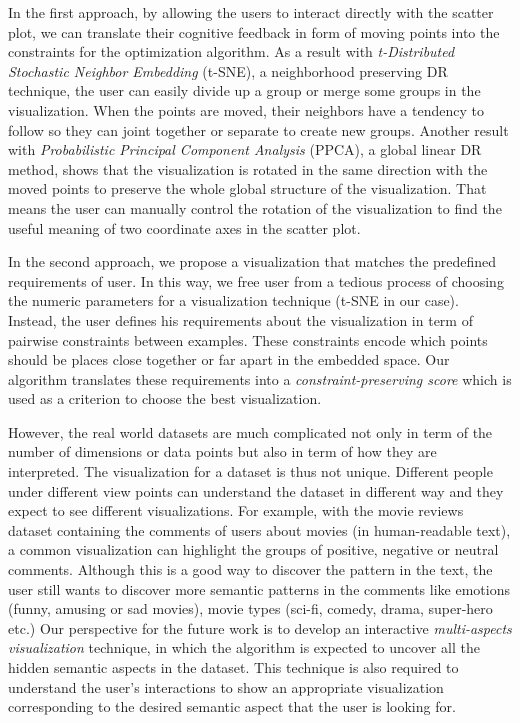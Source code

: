 In the first approach, by allowing the users to interact directly with the scatter plot, we can translate their cognitive feedback in form of moving points into the constraints for the optimization algorithm.
As a result with \emph{t-Distributed Stochastic Neighbor Embedding} (t-SNE), a neighborhood preserving DR technique, the user can easily divide up a group or merge some groups in the visualization.
When the points are moved, their neighbors have a tendency to follow so they can joint together or separate to create new groups.
Another result with \emph{Probabilistic Principal Component Analysis} (PPCA), a global linear DR method, shows that the visualization is rotated in the same direction with the moved points to preserve the whole global structure of the visualization. That means the user can manually control the rotation of the visualization to find the useful meaning of two coordinate axes in the scatter plot.

In the second approach, we propose a visualization that matches the predefined requirements of user.
In this way, we free user from a tedious process of choosing the numeric parameters for a visualization technique (t-SNE in our case).
Instead, the user defines his requirements about the visualization in term of pairwise constraints between examples.
These constraints encode which points should be places close together or far apart in the embedded space.
Our algorithm translates these requirements into a \emph{constraint-preserving score} which is used as a criterion to choose the best visualization.

However, the real world datasets are much complicated not only in term of the number of dimensions or data points but also in term of how they are interpreted.
The visualization for a dataset is thus not unique. Different people under different view points can understand the dataset in different way and they expect to see different visualizations.
For example, with the movie reviews dataset containing the comments of users about movies (in human-readable text), a common visualization can highlight the groups of positive, negative or neutral comments.
Although this is a good way to discover the pattern in the text, the user still wants to discover more semantic patterns in the comments like emotions (funny, amusing or sad movies), movie types (sci-fi, comedy, drama, super-hero etc.)
Our perspective for the future work is to develop an interactive \emph{multi-aspects visualization} technique, in which the algorithm is expected to uncover all the hidden semantic aspects in the dataset.
This technique is also required to understand the user's interactions to show an appropriate visualization corresponding to the desired semantic aspect that the user is looking for.